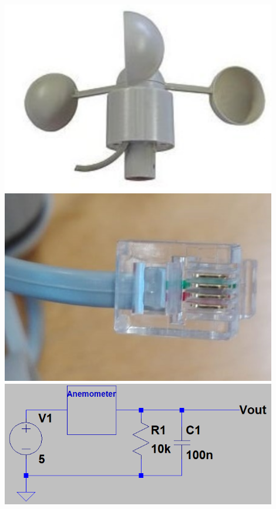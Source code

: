 {\begin{minipage}[b][650pt][t]{0.44\textwidth}
\centering
\includegraphics[width=0.9\textwidth]{graphics/Anemometer/anemometer.png}
\label{fig:anemometer}
\vspace{20pt}
\includegraphics[width=0.9\textwidth]{graphics/Anemometer/rj_11_anschlussstecker.png}
\label{fig:rj11stecker}
\vspace{20pt}
\includegraphics[width=0.9\textwidth]{graphics/Anemometer/schaltung_anemometer.png}

\end{minipage}}
